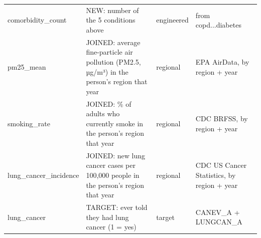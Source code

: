 \begin{tabularx}{\textwidth}{>{\raggedright\arraybackslash}p{3.8cm} >{\raggedright\arraybackslash}X l >{\raggedright\arraybackslash}p{3.4cm}}
comorbidity\_count & NEW: number of the 5 conditions above & engineered & from copd...diabetes \\
pm25\_mean & JOINED: average fine-particle air pollution (PM2.5, µg/m³) in the person's region that year & regional & EPA AirData, by region + year \\
smoking\_rate & JOINED: \% of adults who currently smoke in the person's region that year & regional & CDC BRFSS, by region + year \\
lung\_cancer\_incidence & JOINED: new lung cancer cases per 100,000 people in the person's region that year & regional & CDC US Cancer Statistics, by region + year \\
lung\_cancer & TARGET: ever told they had lung cancer (1 = yes) & target & CANEV\_A + LUNGCAN\_A \\
\bottomrule
\end{tabularx}
